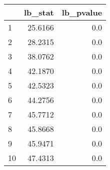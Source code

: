 \begin{tabular}{lrr}
\toprule
{} &  lb\_stat &  lb\_pvalue \\
\midrule
1  &  25.6166 &        0.0 \\
2  &  28.2315 &        0.0 \\
3  &  38.0762 &        0.0 \\
4  &  42.1870 &        0.0 \\
5  &  42.5323 &        0.0 \\
6  &  44.2756 &        0.0 \\
7  &  45.7712 &        0.0 \\
8  &  45.8668 &        0.0 \\
9  &  45.9471 &        0.0 \\
10 &  47.4313 &        0.0 \\
\bottomrule
\end{tabular}
